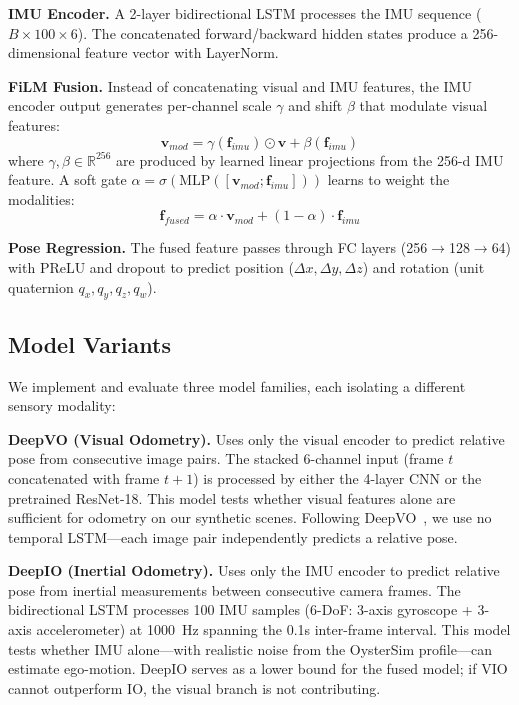 \documentclass[conference]{IEEEtran}
\begin{document}
\textbf{IMU Encoder.} A 2-layer bidirectional LSTM processes the IMU sequence ($B \times 100 \times 6$). The concatenated forward/backward hidden states produce a 256-dimensional feature vector with LayerNorm.

\textbf{FiLM Fusion.} Instead of concatenating visual and IMU features, the IMU encoder output generates per-channel scale $\gamma$ and shift $\beta$ that modulate visual features:
\begin{equation}
    \mathbf{v}_{mod} = \gamma(\mathbf{f}_{imu}) \odot \mathbf{v} + \beta(\mathbf{f}_{imu})
\end{equation}
where $\gamma, \beta \in \mathbb{R}^{256}$ are produced by learned linear projections from the 256-d IMU feature. A soft gate $\alpha = \sigma(\text{MLP}([\mathbf{v}_{mod}; \mathbf{f}_{imu}]))$ learns to weight the modalities:
\begin{equation}
    \mathbf{f}_{fused} = \alpha \cdot \mathbf{v}_{mod} + (1 - \alpha) \cdot \mathbf{f}_{imu}
\end{equation}

\textbf{Pose Regression.} The fused feature passes through FC layers (256$\to$128$\to$64) with PReLU and dropout to predict position ($\Delta x, \Delta y, \Delta z$) and rotation (unit quaternion $q_x, q_y, q_z, q_w$).

\subsection{Model Variants}

We implement and evaluate three model families, each isolating a different sensory modality:

\textbf{DeepVO (Visual Odometry).} Uses only the visual encoder to predict relative pose from consecutive image pairs. The stacked 6-channel input (frame $t$ concatenated with frame $t+1$) is processed by either the 4-layer CNN or the pretrained ResNet-18. This model tests whether visual features alone are sufficient for odometry on our synthetic scenes. Following DeepVO~\cite{wang2017}, we use no temporal LSTM---each image pair independently predicts a relative pose.

\textbf{DeepIO (Inertial Odometry).} Uses only the IMU encoder to predict relative pose from inertial measurements between consecutive camera frames. The bidirectional LSTM processes 100 IMU samples (6-DoF: 3-axis gyroscope + 3-axis accelerometer) at 1000~Hz spanning the 0.1s inter-frame interval. This model tests whether IMU alone---with realistic noise from the OysterSim profile---can estimate ego-motion. DeepIO serves as a lower bound for the fused model; if VIO cannot outperform IO, the visual branch is not contributing.
\end{document}
